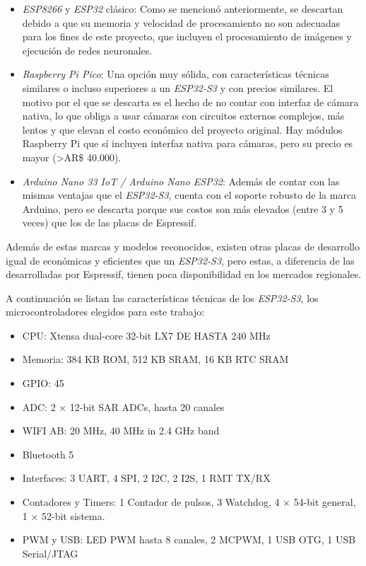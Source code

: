 \begin{itemize}

\item \emph{ESP8266} y \emph{ESP32} clásico: Como se mencionó anteriormente, se descartan debido a que su memoria y velocidad de procesamiento no son adecuadas para los fines de este proyecto, que incluyen el procesamiento de imágenes y ejecución de redes neuronales.

\item \emph{Raspberry Pi Pico}: Una opción muy sólida, con características técnicas similares o incluso superiores a un \emph{ESP32-S3} y con precios similares. El motivo por el que se descarta es el hecho de no contar con interfaz de cámara nativa, lo que obliga a usar cámaras con circuitos externos complejos, más lentos y que elevan el costo económico del proyecto original. Hay módulos Raspberry Pi que sí incluyen interfaz nativa para cámaras, pero su precio es mayor (>AR\$ 40.000).

\item \emph{Arduino Nano 33 IoT / Arduino Nano ESP32}: Además de contar con las mismas ventajas que el \emph{ESP32-S3}, cuenta con el soporte robusto de la marca Arduino, pero se descarta porque sus costos son más elevados (entre 3 y 5 veces) que los de las placas de Espressif.

\end{itemize}

Además de estas marcas y modelos reconocidos, existen otras placas de desarrollo igual de económicas y eficientes que un \emph{ESP32-S3}, pero estas, a diferencia de las desarrolladas por Espressif, tienen poca disponibilidad en los mercados regionales.

A continuación se listan las características técnicas de los \emph{ESP32-S3}, los microcontroladores elegidos para este trabajo:

\begin{itemize}
\item CPU: Xtensa dual-core 32-bit LX7 DE HASTA 240 MHz

\item Memoria: 384 KB ROM, 512 KB SRAM, 16 KB RTC SRAM 

\item GPIO: 45

\item ADC: 2 × 12-bit SAR ADCs, hasta 20 canales 

\item WIFI AB: 20 MHz, 40 MHz in 2.4 GHz band

\item Bluetooth 5 

\item Interfaces: 3 UART, 4 SPI, 2 I2C, 2 I2S, 1 RMT TX/RX 
\item Contadores y Timers: 1 Contador de pulsos, 3 Watchdog, 4 × 54-bit general, 1 × 52-bit sistema.
\item PWM y USB: LED PWM hasta 8 canales, 2 MCPWM, 1 USB OTG, 1 USB Serial/JTAG

\end{itemize}

